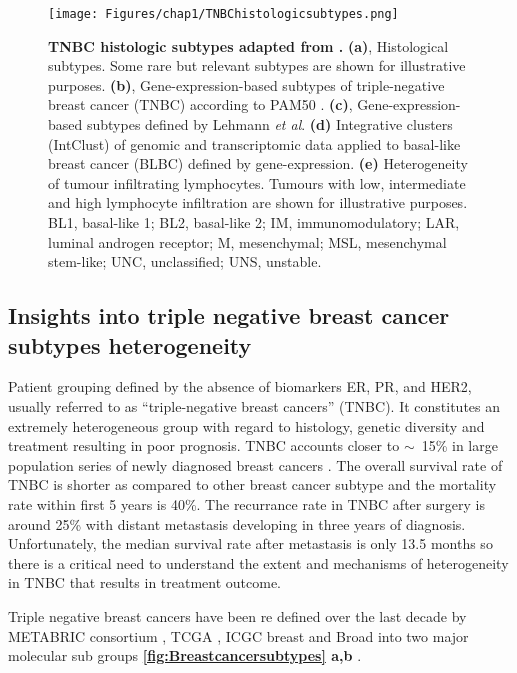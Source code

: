
\begin{figure}
\centering
\texttt{[image: Figures/chap1/TNBChistologicsubtypes.png]}
	\caption[TNBC histologic subtypes adapted from  \cite{bianchini2016triple} ]
	{\small
	    \textbf{TNBC histologic subtypes adapted from \cite{bianchini2016triple}.}
	    \textbf{(a)}, Histological subtypes. Some rare but relevant subtypes are shown for
illustrative purposes.
	    \textbf{(b)}, Gene-expression-based subtypes of triple-negative breast cancer (TNBC) according to PAM50 \cite{prat2013molecular}.
	    \textbf{(c)}, Gene-expression-based subtypes defined by Lehmann \textit{et al}.\cite{lehmann2011identification}
	     \textbf{(d)} Integrative clusters (IntClust) of genomic and transcriptomic data applied to basal-like breast cancer (BLBC) defined by gene-expression.
	     \textbf{(e)} Heterogeneity of tumour infiltrating lymphocytes. Tumours with low, intermediate and high lymphocyte infiltration are shown for illustrative
purposes. BL1, basal-like 1; BL2, basal-like 2; IM, immunomodulatory; LAR, luminal androgen receptor; M, mesenchymal;
MSL, mesenchymal stem-like; UNC, unclassified; UNS, unstable.
	}
	\label{fig:TNBChistologicsubtypes}
\end{figure}
\subsection{Insights into triple negative breast cancer subtypes heterogeneity}
Patient grouping defined by the absence of biomarkers ER, PR, and HER2, usually referred to as ``triple-negative breast cancers'' (TNBC). It constitutes an extremely heterogeneous group with regard to histology, genetic diversity and treatment resulting in poor prognosis. TNBC accounts  closer to $\sim$~15\% in large population series of newly diagnosed breast cancers \cite{reis2008triple}.
The overall survival rate of TNBC is shorter as compared to other breast cancer subtype and the mortality rate within first 5 years is 40\%. The recurrance rate in TNBC after surgery is  around 25\% with distant metastasis developing in three years of diagnosis. Unfortunately, the median survival rate after metastasis is only 13.5 months \cite{dent2007triple,lin2008sites} so there is a critical need to understand the extent and mechanisms of heterogeneity in TNBC that results in treatment outcome. 

Triple negative breast cancers have been re defined over the last decade by METABRIC consortium \cite{curtis2012genomic, dvinge2013shaping, pereira2016somatic, dawson2013new, bilal2013improving}, TCGA \cite{weinstein2013cancer}, ICGC breast \cite{international2010international} and Broad \cite{banerji2012sequence, rheinbay2017recurrent} into two major molecular sub groups \textbf{\autoref{fig:Breastcancersubtypes} a,b} \cite{xu2014omics}.

